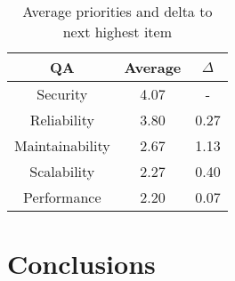 \documentclass[utf8,english]{gradu3}
\begin{document}
\begin{table}[!h]
  \begin{center}
    \caption{Average priorities and delta to next highest item}
    \label{table:priorities3}
    \begin{tabular}{|c|c|c|}
      \hline
      \textbf{QA}     & \textbf{Average} & \textbf{$\Delta$} \\
      \hline
      Security        & 4.07             & -                 \\
      Reliability     & 3.80             & 0.27              \\
      Maintainability & 2.67             & 1.13              \\
      Scalability     & 2.27             & 0.40              \\
      Performance     & 2.20             & 0.07              \\
      \hline
    \end{tabular}
  \end{center}
\end{table}

\chapter{Conclusions}


\printbibliography

\nocite{*}

\appendix
\end{document}
